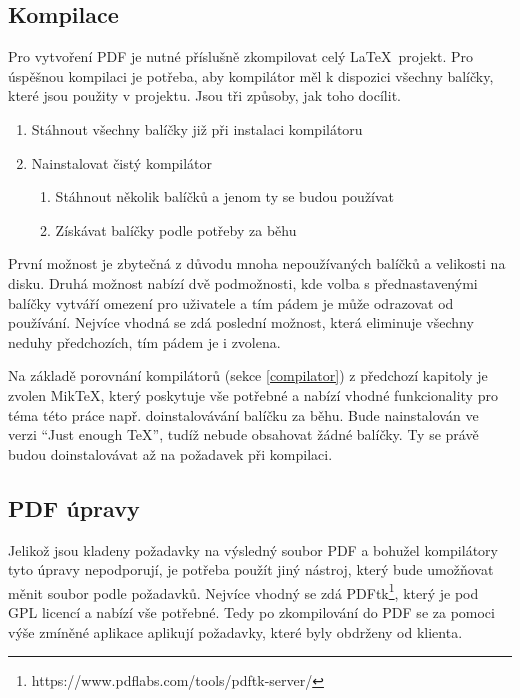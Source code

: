 \subsection{Kompilace}
Pro vytvoření PDF je nutné příslušně zkompilovat celý \LaTeX\ projekt. Pro úspěšnou kompilaci je potřeba, aby kompilátor měl k dispozici všechny balíčky, které jsou použity v projektu. Jsou tři způsoby, jak toho docílit.
\begin{enumerate}
	\item Stáhnout všechny balíčky již při instalaci kompilátoru
	\item Nainstalovat čistý kompilátor
		\begin{enumerate}
			\item Stáhnout několik balíčků a jenom ty se budou používat
			\item Získávat balíčky podle potřeby za běhu
		\end{enumerate}
\end{enumerate}
První možnost je zbytečná z důvodu mnoha nepoužívaných balíčků a velikosti na disku. Druhá možnost nabízí dvě podmožnosti, kde volba s přednastavenými balíčky vytváří omezení pro uživatele a tím pádem je může odrazovat od používání. Nejvíce vhodná se zdá poslední možnost, která eliminuje všechny neduhy předchozích, tím pádem je i zvolena.
\par
Na základě porovnání kompilátorů (sekce \ref{compilator}) z předchozí kapitoly je zvolen MikTeX, který poskytuje vše potřebné a nabízí vhodné funkcionality pro téma této práce např. doinstalovávání balíčku za běhu. Bude nainstalován ve verzi \enquote{Just enough TeX}, tudíž nebude obsahovat žádné balíčky. Ty se právě budou doinstalovávat až na požadavek při kompilaci.

\subsection{PDF úpravy}
Jelikož jsou kladeny požadavky na výsledný soubor PDF a bohužel kompilátory tyto úpravy nepodporují, je potřeba použít jiný nástroj, který bude umožňovat měnit soubor podle požadavků. Nejvíce vhodný se zdá PDFtk\footnote{https://www.pdflabs.com/tools/pdftk-server/}, který je pod GPL licencí a nabízí vše potřebné. Tedy po zkompilování do PDF se za pomoci výše zmíněné aplikace aplikují požadavky, které byly obdrženy od klienta.

